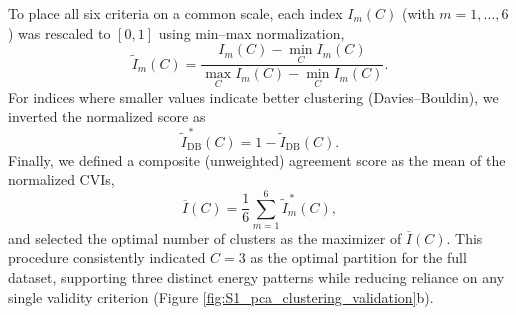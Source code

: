 \documentclass[pdflatex,sn-chicago]{sn-jnl}%
\theoremstyle{plain}
\theoremstyle{definition}
\theoremstyle{remark}
\theoremstyle{definition}
\begin{document}
To place all six criteria on a common scale, each index $I_m(C)$ (with $m=1,\ldots,6$) was rescaled to $[0,1]$ using min--max normalization,
\begin{equation}
\widetilde{I}_m(C) = \frac{I_m(C) - \min\limits_{C} I_m(C)}{\max\limits_{C} I_m(C) - \min\limits_{C} I_m(C)}.
\end{equation}
For indices where smaller values indicate better clustering (Davies--Bouldin), we inverted the normalized score as
\begin{equation}
\widetilde{I}_{\mathrm{DB}}^{\,*}(C) = 1 - \widetilde{I}_{\mathrm{DB}}(C).
\end{equation}
Finally, we defined a composite (unweighted) agreement score as the mean of the normalized CVIs,
\begin{equation}
\overline{I}(C) = \frac{1}{6}\sum_{m=1}^{6}\widetilde{I}_m^{\,*}(C),
\end{equation}
and selected the optimal number of clusters as the maximizer of $\overline{I}(C)$. This procedure consistently indicated $C=3$ as the optimal partition for the full dataset, supporting three distinct energy patterns while reducing reliance on any single validity criterion  (Figure \ref{fig:S1_pca_clustering_validation}b). 
\end{document}
